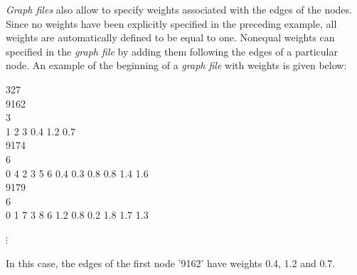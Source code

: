 {\em Graph files} also allow to specify weights associated with
the edges of the nodes. Since no weights have been explicitly
specified in the preceding example, all weights are automatically
defined to be equal to one. Nonequal weights can specified in the
{\em graph file} by adding them following the edges of a
particular node. An example of the beginning of a {\em graph file}
with weights is given below:

\footnotesize

327 \\
9162 \\
3 \\
1 2 3 0.4 1.2 0.7\\
9174 \\
6 \\
0 4 2 3 5 6 0.4 0.3 0.8 0.8 1.4 1.6\\
9179 \\
6 \\
0 1 7 3 8 6 1.2 0.8 0.2 1.8 1.7 1.3

\hspace{1cm} $\vdots$

\normalsize

\vspace{0.5cm}

In this case, the edges of the first node '9162' have weights 0.4,
1.2 and 0.7.\bigskip



